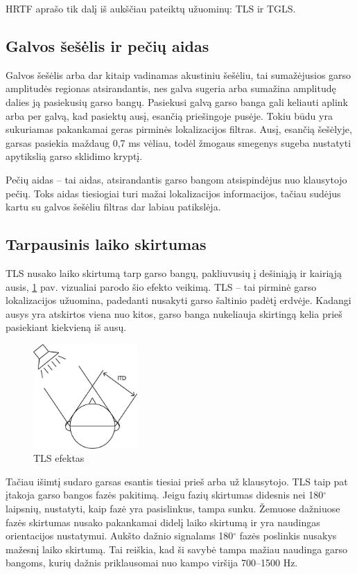 \documentclass[]{vgtuef}
\begin{document}
HRTF aprašo tik dalį iš aukščiau pateiktų užuominų: TLS ir TGLS.


\subsection{Galvos šešėlis ir pečių aidas}

Galvos šešėlis arba dar kitaip vadinamas akustiniu šešėliu, tai sumažėjusios garso amplitudės regionas atsirandantis, nes galva sugeria arba sumažina amplitudę dalies ją pasiekusių garso bangų. Pasiekusi galvą garso banga gali keliauti aplink arba per galvą, kad pasiektų ausį, esančią priešingoje pusėje. Tokiu būdu yra sukuriamas pakankamai geras pirminės lokalizacijos filtras. Ausį, esančią šešėlyje, garsas pasiekia maždaug 0,7 ms vėliau, todėl žmogaus smegenys sugeba nustatyti apytikslią garso sklidimo kryptį. 

Pečių aidas -- tai aidas, atsirandantis garso bangom atsispindėjus nuo klausytojo pečių. Toks aidas tiesiogiai turi mažai lokalizacijos informacijos, tačiau sudėjus kartu su galvos šešėliu filtras dar labiau patikslėja.


\subsection{Tarpausinis laiko skirtumas}

TLS nusako laiko skirtumą tarp garso bangų, pakliuvusių į dešiniąją ir kairiąją ausis, \ref{fig:ITD_1} pav. vizualiai parodo šio efekto veikimą. TLS – tai pirminė garso lokalizacijos užuomina, padedanti nusakyti garso šaltinio padėtį erdvėje. Kadangi ausys yra atskirtos viena nuo kitos, garso banga nukeliauja skirtingą kelia prieš pasiekiant kiekvieną iš ausų.

\begin{figure}[!ht]
  \centering
  \includegraphics[width=150px]{img/ITD.jpg}
  \caption{TLS efektas}
  \label{fig:ITD_1}
\end{figure}

Tačiau išimtį sudaro garsas esantis tiesiai prieš arba už klausytojo. TLS taip pat įtakoja garso bangos fazės  pakitimą. Jeigu fazių skirtumas didesnis nei 180$^\circ$ laipsnių, nustatyti, kaip fazė yra pasislinkus, tampa sunku. Žemuose dažniuose fazės skirtumas nusako pakankamai didelį laiko skirtumą ir yra naudingas orientacijos nustatymui. Aukšto dažnio signalams 180$^\circ$ fazės poslinkis  nusakys mažesnį laiko skirtumą. Tai reiškia, kad ši savybė tampa mažiau naudinga garso bangoms, kurių dažnis priklausomai nuo kampo viršija 700--1500 Hz.
\end{document}
